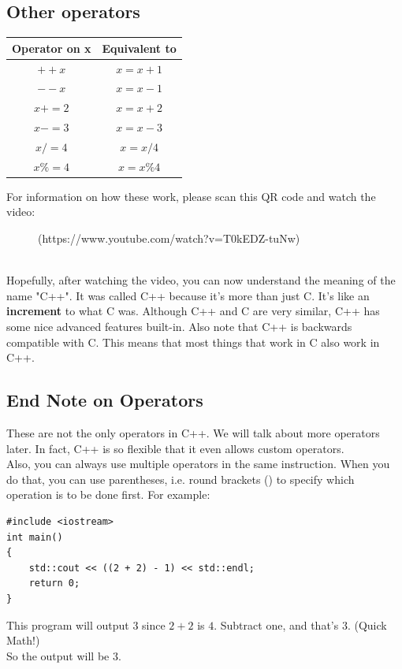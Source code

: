 \documentclass[letterpaper, 12pt]{book}
\begin{document}
\subsection{Other operators}
\begin{center}
	\begin{tabular}{ |c|c| } 
		\hline
		Operator on x & Equivalent to\\
		\hline
		$++x$ & $x = x + 1$\\
		$--x$ & $x = x - 1$\\
		$x += 2$ & $x = x + 2$\\
		$x -= 3$ & $x = x - 3$\\
		$x /= 4$ & $x = x / 4$\\
		$x \%= 4$& $x = x \% 4$\\
		\hline
	\end{tabular}
\end{center}
For information on how these work, please scan this QR code and watch the video:\\
\begin{figure}[h]
\centering
{}
\caption{(https://www.youtube.com/watch?v=T0kEDZ-tuNw)}
\end{figure}\\
Hopefully, after watching the video, you can now understand the meaning of the name "C++". It was called C++ because it's more than just C. It's like an \textbf{increment} to what C was. Although C++ and C are very similar, C++ has some nice advanced features built-in. Also note that C++ is backwards compatible with C. This means that most things that work in C also work in C++.
\subsection{End Note on Operators}
These are not the only operators in C++. We will talk about more operators later. In fact, C++ is so flexible that it even allows custom operators.\\
Also, you can always use multiple operators in the same instruction. When you do that, you can use parentheses, i.e. round brackets () to specify which operation is to be done first. For example:
\begin{lstlisting}
#include <iostream>
int main()
{
	std::cout << ((2 + 2) - 1) << std::endl;
	return 0;
}
\end{lstlisting}
This program will output 3 since $2 + 2$ is $4$. Subtract one, and that's $3$. (Quick Math!)\\
So the output will be 3.
\end{document}
